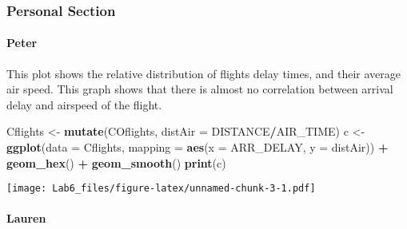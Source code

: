 \documentclass[]{article}
\newenvironment{Shaded}{\begin{snugshade}}{\end{snugshade}}
\newcommand{\KeywordTok}[1]{\textcolor[rgb]{0.13,0.29,0.53}{\textbf{#1}}}
\newcommand{\DataTypeTok}[1]{\textcolor[rgb]{0.13,0.29,0.53}{#1}}
\newcommand{\StringTok}[1]{\textcolor[rgb]{0.31,0.60,0.02}{#1}}
\newcommand{\OperatorTok}[1]{\textcolor[rgb]{0.81,0.36,0.00}{\textbf{#1}}}
\newcommand{\NormalTok}[1]{#1}
\let\oldparagraph\paragraph
\renewcommand{\paragraph}[1]{\oldparagraph{#1}\mbox{}}
\begin{document}
\subsubsection{Personal Section}\label{personal-section}

\paragraph{Peter}\label{peter-1}

This plot shows the relative distribution of flights delay times, and
their average air speed. This graph shows that there is almost no
correlation between arrival delay and airspeed of the flight.

\begin{Shaded}
\begin{Highlighting}[]
\NormalTok{Cflights <-}\StringTok{ }\KeywordTok{mutate}\NormalTok{(COflights, }\DataTypeTok{distAir =}\NormalTok{ DISTANCE}\OperatorTok{/}\NormalTok{AIR_TIME)}
\NormalTok{c <-}\StringTok{ }\KeywordTok{ggplot}\NormalTok{(}\DataTypeTok{data =}\NormalTok{ Cflights, }\DataTypeTok{mapping =} \KeywordTok{aes}\NormalTok{(}\DataTypeTok{x =}\NormalTok{ ARR_DELAY, }\DataTypeTok{y =}\NormalTok{ distAir)) }\OperatorTok{+}
\StringTok{   }\KeywordTok{geom_hex}\NormalTok{() }\OperatorTok{+}
\StringTok{   }\KeywordTok{geom_smooth}\NormalTok{()}
\KeywordTok{print}\NormalTok{(c)}
\end{Highlighting}
\end{Shaded}

\texttt{[image: Lab6\_files/figure-latex/unnamed-chunk-3-1.pdf]}

\paragraph{Lauren}\label{lauren-1}
\end{document}
